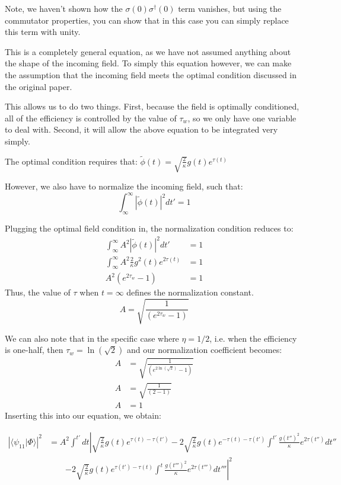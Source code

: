 \documentclass[12pt]{article}
\begin{document}
Note, we haven't shown how the $\sigma(0) \sigma^\dagger(0)$ term vanishes, but using the commutator properties, you can show that in this case you can simply replace this term with unity.

This is a completely general equation, as we have not assumed anything about the shape of the incoming field. 
To simply this equation however, we can make the assumption that the incoming field meets the optimal condition discussed
in the original paper.

This allows us to do two things. First, because the field is optimally conditioned, all of the efficiency is controlled by the value of $\tau_w$, so we only have one variable to deal with. Second, it will allow the above equation to be integrated very simply.

The optimal condition requires that: $\tilde{\phi}(t) = \sqrt{\frac{2}{\kappa}} g(t) e^{\tau(t)}$

However, we also have to normalize the incoming field, such that:
\begin{equation}
\int^\infty_\infty | \tilde{\phi}(t) |^2 dt' =1
\end{equation}

Plugging the optimal field condition in, the normalization condition reduces to:
\begin{align}
\int^\infty_\infty A^2| \tilde{\phi}(t) |^2 dt' &=1\\
\int^\infty_\infty A^2 \frac{2}{\kappa} g^2(t) e^{2\tau(t)} &=1\\
 A^2 \left( e^{2\tau_w} -1\right)&=1
 \end{align}
 Thus, the value of $\tau$ when $t=\infty$ defines the normalization constant. 
 \begin{equation}
 A = \sqrt{\frac{1}{\left(  e^{2\tau_w} -1\right)}}
 \end{equation}

 We can also note that in the specific case where $\eta = 1/2$, i.e. when the efficiency is one-half, then $\tau_w = \ln(\sqrt{2})$ and our normalization coefficient becomes:
 \begin{align}
 A &= \sqrt{\frac{1}{\left(  e^{2\ln(\sqrt{2})} -1\right)}}\\
 A &= \sqrt{\frac{1}{\left( 2-1 \right ) }}\\
 A &= 1
 \end{align}
Inserting this into our equation, we obtain:

\begin{align}
\left | \langle \psi_{11} | \Phi \rangle \right | ^2 &= A^2\int^{t'} dt \left | \sqrt{\frac{2}{\kappa}} g(t) e^{\tau(t)-\tau(t')} \right.
      -2\sqrt{\frac{2}{\kappa}}g(t) e^{-\tau(t)-\tau(t')} \int^{t'} \frac{g(t'')^2}{\kappa} e^{2\tau(t'')} dt'' \\
       &\qquad \left.-2\sqrt{\frac{2}{\kappa}} g(t) e^{\tau(t')-\tau(t)} \int^t \frac{g(t''')^2}{\kappa} e^{2\tau(t''')} dt'''\right |^2
\end{align}
\end{document}
